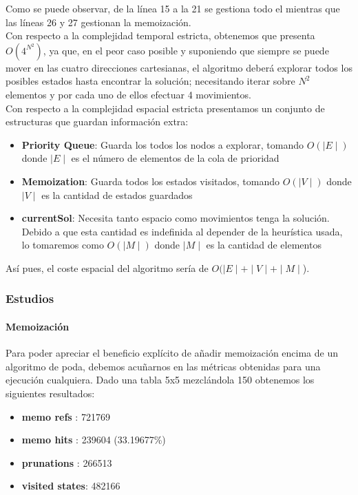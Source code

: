 Como se puede observar, de la línea 15 a la 21 se gestiona todo el  mientras que las líneas 26 y 27 gestionan la memoización.\\

Con respecto a la complejidad temporal estricta, obtenemos que presenta $O(4^{N^2})$, ya que, en el peor caso posible y suponiendo que siempre se puede mover en las cuatro direcciones cartesianas, el algoritmo deberá explorar todos los posibles estados hasta encontrar la solución; necesitando iterar sobre $N^2$ elementos y por cada uno de ellos efectuar 4 movimientos.\\

Con respecto a la complejidad espacial estricta presentamos un conjunto de estructuras que guardan información extra:
\begin{itemize}
    \item \textbf{Priority Queue}: Guarda los todos los nodos a explorar, tomando $O(\mid E\mid)$ donde $\mid E\mid$ es el número de elementos de la cola de prioridad
    \item \textbf{Memoization}: Guarda todos los estados visitados, tomando $O(\mid V\mid)$ donde $\mid V\mid$ es la cantidad de estados guardados 
    \item \textbf{currentSol}: Necesita tanto espacio como movimientos tenga la solución. Debido a que esta cantidad es indefinida al depender de la heurística usada, lo tomaremos como $O(\mid M\mid)$ donde $\mid M\mid$ es la cantidad de elementos
\end{itemize}

Así pues, el coste espacial del algoritmo sería de $O(\mid E\mid + \mid V\mid + \mid M\mid$).

\subsubsection{Estudios}\label{sec:algt_studies}

\paragraph{Memoización}

Para poder apreciar el beneficio explícito de añadir memoización encima de un algoritmo de poda, debemos acuñarnos en las métricas obtenidas para una ejecución cualquiera. Dado una tabla 5x5 mezclándola 150 obtenemos los siguientes resultados:

\begin{itemize}
    \item \textbf{memo refs     }: 721769
    \item \textbf{memo hits     }: 239604 (33.19677\%)
    \item \textbf{prunations    }: 266513
    \item \textbf{visited states}: 482166   
\end{itemize}\medskip

